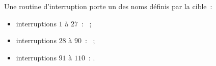 Une routine d'interruption porte un des noms définis par la cible~:
\begin{itemize}
  \item interruptions $1$ à $27$~: ~;
  \item interruptions $28$ à $90$~: ~;
  \item interruptions $91$ à $110$~: .
\end{itemize}






